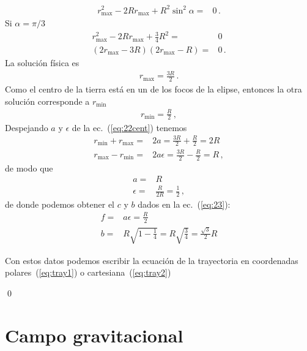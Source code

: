 \begin{frame}
\begin{align}
   r_{\text{max}}^2-2Rr_{\text{max}}+R^2 \sin^2\alpha=&0\,.
\end{align}
Si $\alpha=\pi/3$
\begin{align}
r_{\text{max}}^2-2Rr_{\text{max}}+\frac{3}{4}R^2 =&0\nonumber\\
(2r_{\text{max}}-3R)(2r_{\text{max}}-R)=&0\,.
\end{align}
La solución física es
\begin{align}
  r_{\text{max}}=\frac{3R}{2}\,.
\end{align}
Como el centro de la tierra está en un de los focos de la elipse, entonces la otra solución corresponde a $r_{\text{min}}$
\begin{align}
  r_{\text{min}}=\frac{R}{2}\,,
\end{align}
Despejando $a$ y $\epsilon$ de la ec.~(\ref{eq:22cent}) tenemos
\begin{align}
  r_{\text{min}}+r_{\text{max}}=&2a=\frac{3R}{2}+\frac{R}{2}=2R\nonumber\\
  r_{\text{max}}-r_{\text{min}}=&2a\epsilon=\frac{3R}{2}-\frac{R}{2}=R\,,
\end{align}
de modo que
\begin{align}
  a=&R\nonumber\\
  \epsilon=&\frac{R}{2R}=\frac{1}{2}\,,
\end{align}
de donde podemos obtener el $c$ y $b$ dados en la ec.~(\ref{eq:23}):
\begin{align*}
  f=&a\epsilon=\frac{R}{2}\nonumber\\
  b=&R\sqrt{1-\frac{1}{4}}=R\sqrt{\frac{3}{4}}=\frac{\sqrt{3}}{2}R
\end{align*}

Con estos datos podemos escribir la ecuación de la trayectoria en coordenadas polares~(\ref{eq:tray1}) o cartesiana~(\ref{eq:tray2})

\end{frame}

\qed



\section{Campo gravitacional}

